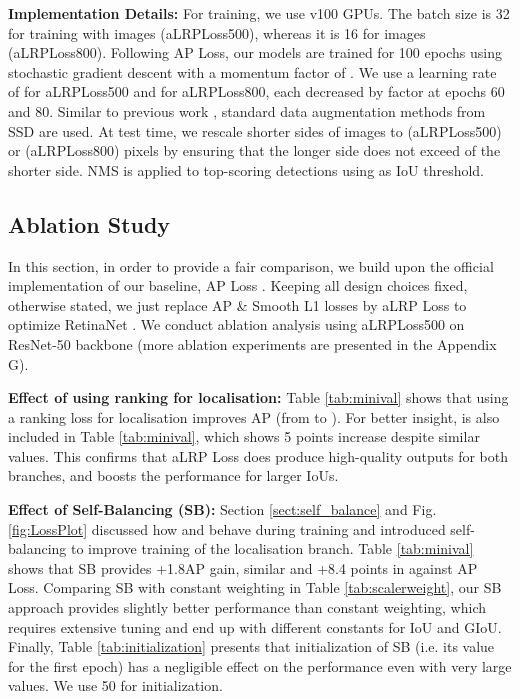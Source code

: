 \documentclass{article}
\begin{document}
\textbf{Implementation Details:} For training, we use  v100 GPUs. The batch size is 32 for training with  images (aLRPLoss500), whereas it is 16 for   images (aLRPLoss800). Following AP Loss, our models are trained for 100 epochs using stochastic gradient descent with a momentum factor of . We use a learning rate of  for aLRPLoss500 and  for aLRPLoss800, each decreased by factor  at epochs 60 and 80. Similar to previous work \cite{APLoss,CenterNet}, standard data augmentation methods from SSD \cite{SSD} are used. At test time, we rescale  shorter sides of images  to  (aLRPLoss500) or  (aLRPLoss800) pixels by ensuring that the longer side does not exceed  of the shorter side. NMS is applied to  top-scoring detections using  as IoU threshold.

\subsection{Ablation Study}
\label{sect:ablation}
In this section, in order to provide a fair comparison, we build upon the official implementation of our baseline, AP Loss \cite{APOfficialRepo}. Keeping all design choices fixed, otherwise stated, we just replace AP \& Smooth L1 losses by aLRP Loss to optimize RetinaNet \cite{FocalLoss}. We conduct ablation analysis using aLRPLoss500 on ResNet-50 backbone (more ablation experiments are presented in the Appendix G).

\textbf{Effect of using ranking for localisation:} Table \ref{tab:minival} shows that using a ranking loss for localisation improves AP (from  to ). For better insight,  is also included in Table \ref{tab:minival}, which shows 5 points increase  despite similar  values. This confirms that aLRP Loss does produce high-quality outputs for both branches, and boosts the performance for larger IoUs.


\textbf{Effect of Self-Balancing (SB):} Section \ref{sect:self_balance} and Fig. \ref{fig:LossPlot} discussed how  and  behave during training and introduced self-balancing to improve training of the localisation branch. Table \ref{tab:minival} shows that SB provides +1.8AP gain, similar  and +8.4 points in  against AP Loss. Comparing SB with constant weighting in Table \ref{tab:scalerweight}, our SB approach provides slightly better performance than constant weighting, which requires extensive tuning and end up with different  constants for IoU and GIoU. Finally, Table \ref{tab:initialization} presents that initialization of SB (i.e. its value for the first epoch) has a negligible effect on the performance even with very large values. We use 50 for initialization.
\end{document}
